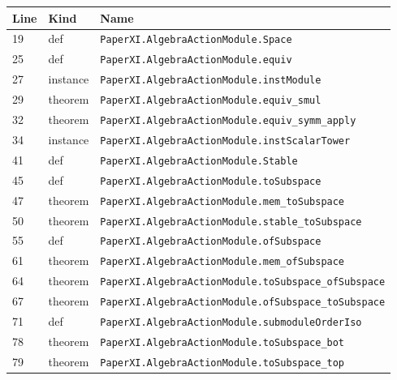 \documentclass[10pt,oneside]{book}
\begin{document}
\begin{longtable}{@{}p{}p{}p{}@{}}\toprule Line&Kind&Name\\\midrule\endhead

19&def&\nolinkurl{PaperXI.AlgebraActionModule.Space}\\

25&def&\nolinkurl{PaperXI.AlgebraActionModule.equiv}\\

27&instance&\nolinkurl{PaperXI.AlgebraActionModule.instModule}\\

29&theorem&\nolinkurl{PaperXI.AlgebraActionModule.equiv_smul}\\

32&theorem&\nolinkurl{PaperXI.AlgebraActionModule.equiv_symm_apply}\\

34&instance&\nolinkurl{PaperXI.AlgebraActionModule.instScalarTower}\\

41&def&\nolinkurl{PaperXI.AlgebraActionModule.Stable}\\

45&def&\nolinkurl{PaperXI.AlgebraActionModule.toSubspace}\\

47&theorem&\nolinkurl{PaperXI.AlgebraActionModule.mem_toSubspace}\\

50&theorem&\nolinkurl{PaperXI.AlgebraActionModule.stable_toSubspace}\\

55&def&\nolinkurl{PaperXI.AlgebraActionModule.ofSubspace}\\

61&theorem&\nolinkurl{PaperXI.AlgebraActionModule.mem_ofSubspace}\\

64&theorem&\nolinkurl{PaperXI.AlgebraActionModule.toSubspace_ofSubspace}\\

67&theorem&\nolinkurl{PaperXI.AlgebraActionModule.ofSubspace_toSubspace}\\

71&def&\nolinkurl{PaperXI.AlgebraActionModule.submoduleOrderIso}\\

78&theorem&\nolinkurl{PaperXI.AlgebraActionModule.toSubspace_bot}\\

79&theorem&\nolinkurl{PaperXI.AlgebraActionModule.toSubspace_top}\\


\end{longtable}
\end{document}
